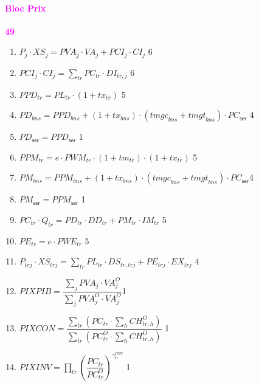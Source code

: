 \documentclass[11pt,a4paper]{article}
\newcommand{\bns}{\mathit{bns}}
\newcommand{\ser}{\mathsf{ser}}
\newcommand{\tm}{\mathit{tm}}
\newcommand{\tmgc}{\mathit{tmgc}}
\newcommand{\tmgt}{\mathit{tmgt}}
\newcommand{\tr}{\mathit{tr}}
\newcommand{\trj}{\mathit{trj}}
\newcommand{\tx}{\mathit{tx}}
\newcommand{\CH}{\mathit{CH}}
\newcommand{\CI}{\mathit{CI}}
\newcommand{\DD}{\mathit{DD}}
\newcommand{\DI}{\mathit{DI}}
\newcommand{\DS}{\mathit{DS}}
\newcommand{\EX}{\mathit{EX}}
\newcommand{\IM}{\mathit{IM}}
\newcommand{\INV}{\mathit{INV}}
\newcommand{\PC}{\mathit{PC}}
\newcommand{\PCI}{\mathit{PCI}}
\newcommand{\PD}{\mathit{PD}}
\newcommand{\PE}{\mathit{PE}}
\newcommand{\PIXCON}{\mathit{PIXCON}}
\newcommand{\PIXINV}{\mathit{PIXINV}}
\newcommand{\PIXPIB}{\mathit{PIXPIB}}
\newcommand{\PL}{\mathit{PL}}
\newcommand{\PM}{\mathit{PM}}
\newcommand{\PPD}{\mathit{PPD}}
\newcommand{\PPM}{\mathit{PPM}}
\newcommand{\PVA}{\mathit{PVA}}
\newcommand{\PWE}{\mathit{PWE}}
\newcommand{\PWM}{\mathit{PWM}}
\newcommand{\VA}{\mathit{VA}}
\newcommand{\XS}{\mathit{XS}}
\newcommand{\redparagraph}[1]{\paragraph*{\large\textcolor{Fuchsia}{#1}}}
\begin{document}
	\redparagraph{Bloc Prix}\hfill \textcolor{Fuchsia}{\textbf{49}} 
	\begin{enumerate}[itemsep=2pt,label=\textbf{eq\arabic*}.,resume,  ref=\textbf{eq\arabic*}]
		
		\item $P_{j}\cdot \XS_{j} = \PVA_{j}\cdot\VA_{j} + \PCI_{j}\cdot\CI_{j}$ \hfill 6
		
		\item $\PCI_j\cdot \CI_j = \displaystyle\sum_{\tr}\PC_{\tr}\cdot\DI_{\tr,j}$ \hfill 6
		
		\item  $\PPD_{\tr} = \PL_{\tr}\cdot\left(1 + \tx_{\tr}\right)$ \label{it:PPD}\hfill 5 
		
		\item $\PD_{\bns} = \PPD_{\bns} + \left(1 + \tx_{\bns}\right)\cdot\left(\tmgc_{\bns} + \tmgt_{\bns}\right)\cdot\PC_{\ser}$ \label{it:PDbns}\hfill 4 
		
		\item $\PD_{\ser} = \PPD_{\ser}$  \label{it:PDser}\hfill 1
		
		\item $\PPM_{\tr} = e\cdot\PWM_{\tr}\cdot\left(1+\tm_{\tr}\right)\cdot\left(1+\tx_{\tr}\right)$\label{it:PPM} \hfill 5  
		
		\item $\PM_{\bns} = \PPM_{\bns} +\left(1 + \tx_{\bns}\right)\cdot\left(\tmgc_{\bns} + \tmgt_{\bns}\right)\cdot\PC_{\ser}$\label{it:PMbns}\hfill 4
		
		\item $\PM_{\ser} = \PPM_{\ser}$ \label{it:PMser}\hfill 1
		
		\item $\PC_{\tr}\cdot Q_{\tr} = \PD_{\tr}\cdot \DD_{\tr} +\PM_{\tr}\cdot\IM_{\tr}$  \label{it:PCbns}  \hfill 5
		
		\item $\PE_{\tr} = e\cdot\PWE_{\tr}$ \hfill 5
		
		\item $P_{\trj}\cdot\XS_{\trj} =  \sum_{\tr}\PL_{\tr}\cdot\DS_{\tr,\trj} + \PE_{\trj}\cdot\EX_{\trj}$ \hfill 4
		
		\item $\PIXPIB = \dfrac{\displaystyle\sum_{j}\PVA_j\cdot\VA_j^O}{\displaystyle\sum_{j}\PVA_j^O\cdot\VA_j^O}$\hfill 1
		
		\item $\PIXCON = \dfrac{\displaystyle\sum_{\tr}\left(\PC_{\tr}\cdot\sum_{h}\CH_{\tr,h}^O\right)}{\displaystyle\sum_{\tr}\left(\PC_{\tr}^O\cdot\sum_{h}\CH_{\tr,h}^O\right)}$ \hfill 1
		
		\item $\PIXINV = \prod_{\tr}\left( \dfrac{\PC_{\tr}}{\PC_{\tr}^O}\right)^{\gamma^{\INV}_{\tr}}$ \hfill 1
		
	\end{enumerate}
	
\end{document}
